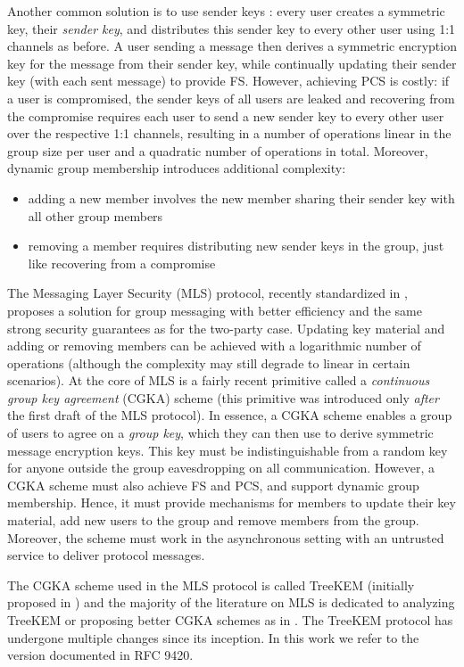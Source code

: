 Another common solution is to use sender keys \cite{sender-keys}: every user creates a symmetric key, their \emph{sender key}, and distributes this sender key to every other user using 1:1 channels as before. A user sending a message then derives a symmetric encryption key for the message from their sender key, while continually updating their sender key (with each sent message) to provide FS. However, achieving PCS is costly: if a user is compromised, the sender keys of all users are leaked and recovering from the compromise requires each user to send a new sender key to every other user over the respective 1:1 channels, resulting in a number of operations linear in the group size per user and a quadratic number of operations in total. Moreover, dynamic group membership introduces additional complexity:
\begin{itemize}
	\item adding a new member involves the new member sharing their sender key with all other group members
	\item removing a member requires distributing new sender keys in the group, just like recovering from a compromise
\end{itemize}
The Messaging Layer Security (MLS) protocol, recently standardized in \cite{rfc9420}, proposes a solution for group messaging with better efficiency and the same strong security guarantees as for the two-party case. Updating key material and adding or removing members can be achieved with a logarithmic number of operations (although the complexity may still degrade to linear in certain scenarios). At the core of MLS is a fairly recent primitive called a \emph{continuous group key agreement} (CGKA) scheme \cite{rtreekem} (this primitive was introduced only \emph{after} the first draft of the MLS protocol). In essence, a CGKA scheme enables a group of users to agree on a \emph{group key}, which they can then use to derive symmetric message encryption keys. This key must be indistinguishable from a random key for anyone outside the group eavesdropping on all communication. However, a CGKA scheme must also achieve FS and PCS, and support dynamic group membership. Hence, it must provide mechanisms for members to update their key material, add new users to the group and remove members from the group. Moreover, the scheme must work in the asynchronous setting with an untrusted service to deliver protocol messages.

The CGKA scheme used in the MLS protocol is called TreeKEM (initially proposed in \cite{treekem}) and the majority of the literature on MLS is dedicated to analyzing TreeKEM or proposing better CGKA schemes as in \cite{ttkem,rtreekem,insider-security,modular-group-messaging}. The TreeKEM protocol has undergone multiple changes since its inception. In this work we refer to the version documented in RFC 9420.

